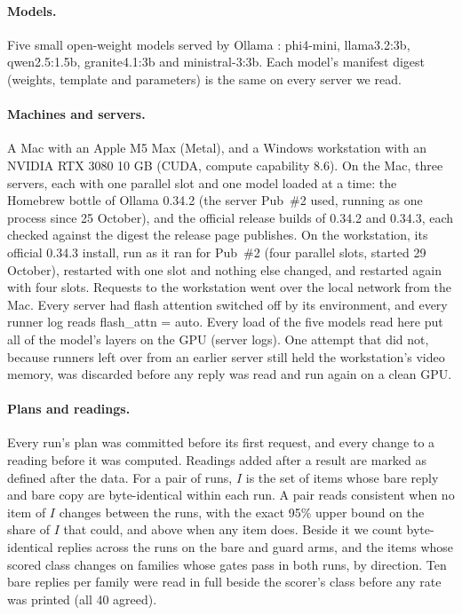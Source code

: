 \documentclass[11pt]{article}
\begin{document}
\paragraph{Models.} Five small open-weight models served by Ollama \citep{ollama}: phi4-mini, llama3.2:3b, qwen2.5:1.5b, granite4.1:3b and
ministral-3:3b. Each model's manifest digest (weights, template and parameters) is the same on every server we read.

\paragraph{Machines and servers.} A Mac with an Apple M5 Max (Metal), and a Windows workstation with an NVIDIA RTX 3080 10 GB (CUDA,
compute capability 8.6). On the Mac, three servers, each with one parallel slot and one model loaded at a time: the Homebrew bottle of
Ollama 0.34.2 (the server Pub~\#2 used, running as one process since 25 October), and the official release builds of 0.34.2 and 0.34.3,
each checked against the digest the release page publishes. On the workstation, its official 0.34.3 install, run as it ran for Pub~\#2
(four parallel slots, started 29 October), restarted with one slot and nothing else changed, and restarted again with four slots.
Requests to the workstation went over the local network from the Mac. Every server had flash attention switched off by its environment,
and every runner log reads flash\_attn = auto. Every load of the five models read here put all of the model's layers on the GPU (server
logs). One attempt that did not, because runners left over from an earlier server still held the workstation's video memory, was
discarded before any reply was read and run again on a clean GPU.

\paragraph{Plans and readings.} Every run's plan was committed before its first request, and every change to a reading before it was
computed. Readings added after a result are marked as defined after the data. For a pair of runs, $I$ is the set of items whose bare
reply and bare copy are byte-identical within each run. A pair reads consistent when no item of $I$ changes between the runs, with the
exact 95\% upper bound on the share of $I$ that could, and above when any item does. Beside it we count byte-identical replies across the
runs on the bare and guard arms, and the items whose scored class changes on families whose gates pass in both runs, by direction. Ten
bare replies per family were read in full beside the scorer's class before any rate was printed (all 40 agreed).
\end{document}
